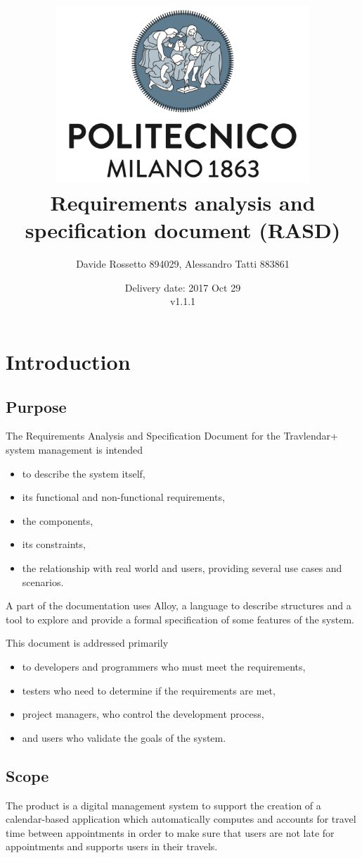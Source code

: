 \documentclass{article}
\title{ 
	\includegraphics[width=95mm]{img/PolimiLogo.png} \\
	\bigskip
	Requirements analysis and specification document (RASD)
}
\author{
	Davide Rossetto 894029, Alessandro Tatti 883861
}
\date{
	Delivery date: 2017 Oct 29\\
	\bigskip v1.1.1
}
\begin{document}
	
\maketitle
\newpage
\tableofcontents
\newpage
	
	
	\section{Introduction}
	
	
	\subsection{Purpose}
	The Requirements Analysis and Specification Document for the Travlendar+ system management is intended
	\begin{itemize}
		\item to describe the system itself, 
		\item its functional and non-functional requirements, 
		\item the components, 
		\item its constraints,
		\item the relationship with real world and users,  providing several use cases and scenarios.
	\end{itemize}

	\bigskip
	A part of the documentation uses Alloy, a language to describe structures and a tool to explore and provide a formal specification of some features of the system.

	\bigskip
	This document is addressed primarily 
	\begin{itemize}
		\item to developers and programmers who must meet the requirements,
		\item testers who need to determine if the requirements are met,
		\item project managers, who control the development process,
		\item and users who validate the goals of the system.
	\end{itemize}
	
	
	\subsection{Scope}
	The product is a digital management system to support the creation of a calendar-based application which automatically computes and accounts for travel time between appointments in order to make sure that users are not late for appointments and supports users in their travels.
\end{document}
